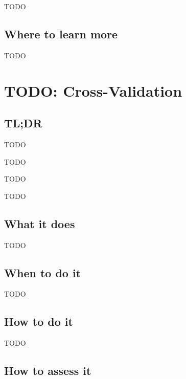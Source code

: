 \documentclass[
]{book}
\providecommand{\tightlist}{%
  \setlength{\itemsep}{0pt}\setlength{\parskip}{0pt}}
\begin{document}
TODO

\hypertarget{where-to-learn-more-8}{%
\section{Where to learn more}\label{where-to-learn-more-8}}

TODO

\hypertarget{cross-validation}{%
\chapter{TODO: Cross-Validation}\label{cross-validation}}

\hypertarget{tldr-9}{%
\section{TL;DR}\label{tldr-9}}

\begin{description}
\tightlist
\item[What it does]
TODO
\item[When to do it]
TODO
\item[How to do it]
TODO
\item[How to assess it]
TODO
\end{description}

\hypertarget{what-it-does-9}{%
\section{What it does}\label{what-it-does-9}}

TODO

\hypertarget{when-to-do-it-9}{%
\section{When to do it}\label{when-to-do-it-9}}

TODO

\hypertarget{how-to-do-it-9}{%
\section{How to do it}\label{how-to-do-it-9}}

TODO

\hypertarget{how-to-assess-it-9}{%
\section{How to assess it}\label{how-to-assess-it-9}}
\end{document}
